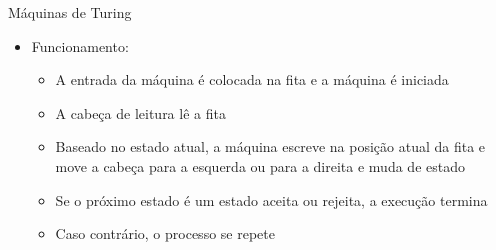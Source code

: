 \documentclass{beamer}
\begin{document}
\begin{frame}{Máquinas de Turing}
	\begin{itemize}
		\item Funcionamento:
		\begin{itemize}
			\item A entrada da máquina é colocada na fita e a máquina é iniciada
			\item A cabeça de leitura lê a fita
			\item Baseado no estado atual, a máquina escreve na posição atual da fita e move a cabeça para a esquerda ou para a direita e muda de estado
			\item Se o próximo estado é um estado \alert{aceita} ou \alert{rejeita}, a execução termina
			\item Caso contrário, o processo se repete
		\end{itemize}
	\end{itemize}
\end{frame}
\end{document}

